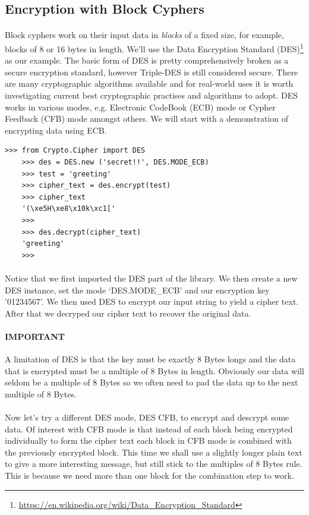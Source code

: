 \documentclass[12pt, a4paper, oneside]{book}
\begin{document}
\subsection{Encryption with Block Cyphers}
\paragraph{} Block cyphers work on their input data in \emph{blocks} of a fixed size, for example, blocks of 8 or 16 bytes in length. We'll use the Data Encryption Standard (DES)\footnote{\url{https://en.wikipedia.org/wiki/Data_Encryption_Standard}} as our example. The basic form of DES is pretty comprehensively broken as a secure encryption standard, however Triple-DES is still considered secure. There are many cryptographic algorithms available and for real-world uses it is worth investigating current best cryptographic practises and algorithms to adopt. DES works in various modes, e.g. Electronic CodeBook (ECB) mode or Cypher Feedback (CFB) mode amongst others. We will start with a demonstration of encrypting data using ECB.

\begin{lstlisting}[style=DOS]
    >>> from Crypto.Cipher import DES
    >>> des = DES.new ('secret!!', DES.MODE_ECB)
    >>> test = 'greeting'
    >>> cipher_text = des.encrypt(test)
    >>> cipher_text
    '(\xe5H\xe8\x10k\xc1['
    >>> 
    >>> des.decrypt(cipher_text)
    'greeting'
    >>> 
\end{lstlisting}

\paragraph{} Notice that we first imported the DES part of the library. We then create a new DES instance, set the mode `DES.MODE\_ECB' and our encryption key '01234567'. We then used DES to encrypt our input string to yield a cipher text. After that we decryped our cipher text to recover the original data.

\paragraph{IMPORTANT} A limitation of DES is that the key must be exactly 8 Bytes longs and the data that is encrypted must be a multiple of 8 Bytes in length. Obviously our data will seldom be a multiple of 8 Bytes so we often need to pad the data up to the next multiple of 8 Bytes.

\paragraph{} Now let's try a different DES mode, DES CFB, to encrypt and descrypt some data. Of interest with CFB mode is that instead of each block being encrypted individually to form the cipher text each block in CFB mode is combined with the previously encrypted block. This time we shall use a slightly longer plain text to give a more interesting message, but still stick to the multiples of 8 Bytes rule. This is because we need more than one block for the combination step to work. 
\end{document}

